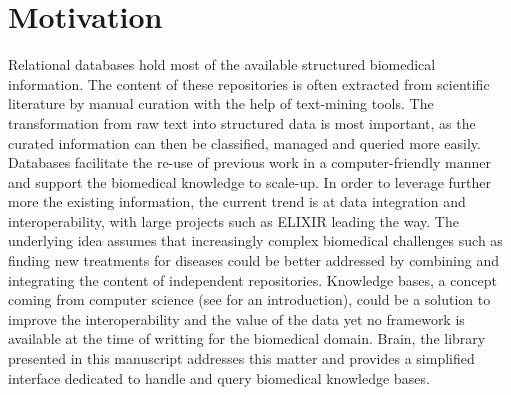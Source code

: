 \documentclass{bioinfo}
\begin{document}
\section{Motivation}
Relational databases hold most of the available structured biomedical information. The content of these repositories is often
extracted from scientific literature by manual curation with the help of text-mining tools. The transformation from raw text into
structured data is most important, as the curated information can then be classified, managed and queried more easily. Databases facilitate
the re-use of previous work in a computer-friendly manner and support the biomedical knowledge to scale-up. In order to leverage further 
more the existing information, the current trend is at data integration and interoperability, with large projects such as 
ELIXIR \citep{Crosswell2012} leading the way.
The underlying idea assumes that increasingly complex biomedical challenges such as finding new treatments for diseases could be better 
addressed by combining  and integrating the content of independent repositories. 
Knowledge bases, a concept coming from computer science (see \citealp{Krotzsch2012} for an introduction), 
could be a solution to improve the interoperability and the value of the data yet no framework is available at the time of writting for 
the biomedical domain. Brain, the library presented in this manuscript addresses this matter and provides a simplified 
interface dedicated to handle and query biomedical knowledge bases.
\end{document}
